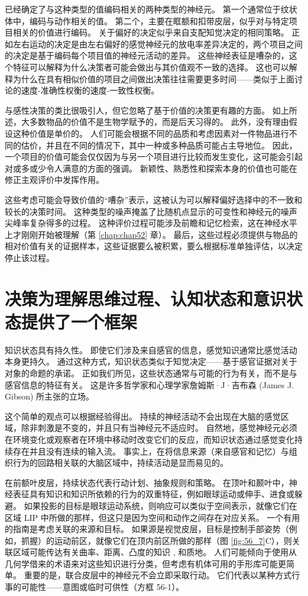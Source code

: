 已经确定了与这种类型的值编码相关的两种类型的神经元。
第一个通常位于纹状体中，编码与动作相关的值。
第二个，主要在眶额和扣带皮层，似乎对与特定项目相关的价值进行编码。
关于偏好的决定似乎来自支配知觉决定的相同策略。
正如左右运动的决定是由左右偏好的感觉神经元的放电率差异决定的，两个项目之间的决定是基于编码每个项目值的神经元活动的差异。
这些神经表征是嘈杂的，这个特征可以解释为什么决策者可能会做出与其价值观不一致的选择。
这也可以解释为什么在具有相似价值的项目之间做出决策往往需要更多时间——类似于上面讨论的速度-准确性权衡的速度-一致性权衡。


与感性决策的类比很吸引人，但它忽略了基于价值的决策更有趣的方面。
如上所述，大多数物品的价值不是生物学赋予的，而是后天习得的。
此外，没有理由假设这种价值是单价的。
人们可能会根据不同的品质和考虑因素对一件物品进行不同的估价，并且在不同的情况下，其中一种或多种品质可能占主导地位。
因此，一个项目的价值可能会仅仅因为与另一个项目进行比较而发生变化，这可能会引起对或多或少令人满意的方面的强调。
新颖性、熟悉性和探索本身的价值也可能在修正主观评价中发挥作用。


这些考虑可能会导致价值的“嘈杂”表示，这被认为可以解释偏好选择中的不一致和较长的决策时间。
这种类型的噪声掩盖了比随机点显示的可变性和神经元的噪声尖峰率复杂得多的过程。
这种评价过程可能涉及前瞻和记忆检索，这在神经水平上才刚刚开始被理解（第 \ref{chap:chap52} 章）。
最后，这些过程必须提供与物品的相对价值有关的证据样本，这些证据要么被积累，要么根据标准单独评估，以决定停止该过程。



\section{决策为理解思维过程、认知状态和意识状态提供了一个框架}

知识状态具有持久性。 即使它们涉及来自感官的信息，感觉知识通常比感觉活动本身更持久。
通过这种方式，知识状态类似于知觉决定——基于感官证据对关于对象的命题的承诺。
正如我们所见，这些状态通常与可能的行为有关，而不是与感官信息的特征有关。
这是许多哲学家和心理学家詹姆斯·J·吉布森 (James J. Gibson) 所主张的立场。


这个简单的观点可以根据经验得出。
持续的神经活动不会出现在大脑的感觉区域，除非刺激是不变的，并且只有当神经元不适应时。
自然地，感觉神经元必须在环境变化或观察者在环境中移动时改变它们的反应，而知识状态通过感觉变化持续存在并且没有连续的输入流。
事实上，在将信息来源（来自感官和记忆）与组织行为的回路相关联的大脑区域中，持续活动是显而易见的。


在前额叶皮层，持续状态代表行动计划、抽象规则和策略。
在顶叶和颞叶中，神经表征具有知识和知识所依赖的行为的双重特征，例如眼球运动或伸手、进食或躲避。
如果投影的目标是眼球运动系统，则响应可以类似于空间表示，就像它们在区域 LIP 中所做的那样，但这只是因为空间和动作之间存在对应关系。
一个有用的指南是考虑关联的来源和目标。
如果源是视觉皮层，目标是控制手部姿势（例如，抓握）的运动前区，就像它们在顶内前区所做的那样（图 \ref{fig:56_7}C），则关联区域可能传达有关曲率、距离、凸度的知识 , 和质地。
人们可能倾向于使用从几何学借来的术语来对这些知识进行分类，但考虑有机体可用的手形库可能更简单。
重要的是，联合皮层中的神经元不会立即采取行动。
它们代表以某种方式行事的可能性——意图或临时可供性（方框 56-1）。


